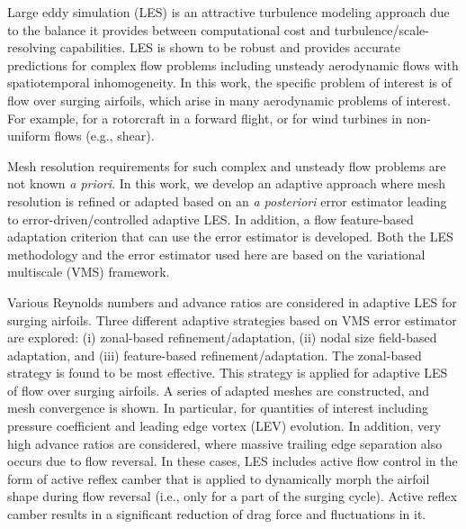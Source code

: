  
 
Large eddy simulation (LES) is an attractive turbulence modeling approach due to the balance it provides between computational cost and turbulence/scale-resolving capabilities. 
LES is shown to be robust and provides accurate predictions for complex flow problems including unsteady aerodynamic flows with spatiotemporal inhomogeneity.
In this work, the specific problem of interest is of flow over surging airfoils, which arise in many aerodynamic problems of interest. For example, for a rotorcraft in a forward flight, or for wind turbines in non-uniform flows (e.g., shear).

Mesh resolution requirements for such complex and unsteady flow problems are not known \textit{a priori}.
In this work, we develop an adaptive approach where mesh resolution is refined or adapted based on an \textit{a posteriori} error estimator leading to error-driven/controlled adaptive LES.
In addition, a flow feature-based adaptation criterion that can use the error estimator is developed.
Both the LES methodology and the error estimator used here are based on the variational multiscale (VMS) framework.

Various Reynolds numbers and advance ratios are considered in adaptive LES for surging airfoils.
Three different adaptive strategies based on VMS error estimator are explored: (i) zonal-based refinement/adaptation, (ii) nodal size field-based adaptation, and (iii) feature-based refinement/adaptation.
The zonal-based strategy is found to be most effective. This strategy is applied for adaptive LES of flow over surging airfoils. A series of adapted meshes are constructed, and mesh convergence is shown. In particular, for quantities of interest including pressure coefficient and leading edge vortex (LEV) evolution.
In addition, very high advance ratios are considered, where massive trailing edge separation also occurs due to flow reversal. In these cases, LES includes active flow control in the form of active reflex camber that is applied to dynamically morph the airfoil shape during flow reversal (i.e., only for a part of the surging cycle). Active reflex camber results in a significant reduction of drag force and fluctuations in it.






